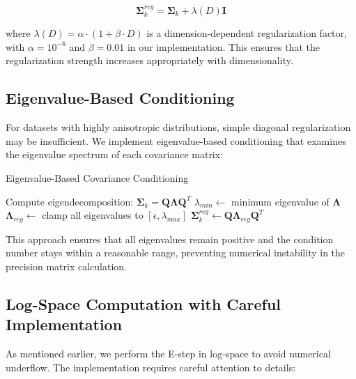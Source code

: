 \documentclass[conference]{IEEEtran}
\begin{document}
\begin{equation}
\boldsymbol{\Sigma}_k^{reg} = \boldsymbol{\Sigma}_k + \lambda(D) \mathbf{I}
\end{equation}

where $\lambda(D) = \alpha \cdot (1 + \beta \cdot D)$ is a dimension-dependent regularization factor, with $\alpha = 10^{-6}$ and $\beta = 0.01$ in our implementation. This ensures that the regularization strength increases appropriately with dimensionality.

\subsection{Eigenvalue-Based Conditioning}

For datasets with highly anisotropic distributions, simple diagonal regularization may be insufficient. We implement eigenvalue-based conditioning that examines the eigenvalue spectrum of each covariance matrix:

\begin{algorithm}
\caption{Eigenvalue-Based Covariance Conditioning}
\begin{algorithmic}[1]
    \STATE Compute eigendecomposition: $\boldsymbol{\Sigma}_k = \mathbf{Q} \boldsymbol{\Lambda} \mathbf{Q}^T$
    \STATE $\lambda_{min} \gets$ minimum eigenvalue of $\boldsymbol{\Lambda}$
        \STATE $\boldsymbol{\Lambda}_{reg} \gets$ clamp all eigenvalues to $[\epsilon, \lambda_{max}]$
        \STATE $\boldsymbol{\Sigma}_k^{reg} \gets \mathbf{Q} \boldsymbol{\Lambda}_{reg} \mathbf{Q}^T$
    \ENDIF
\ENDFOR
\end{algorithmic}
\end{algorithm}

This approach ensures that all eigenvalues remain positive and the condition number stays within a reasonable range, preventing numerical instability in the precision matrix calculation.

\subsection{Log-Space Computation with Careful Implementation}

As mentioned earlier, we perform the E-step in log-space to avoid numerical underflow. The implementation requires careful attention to details:
\end{document}
